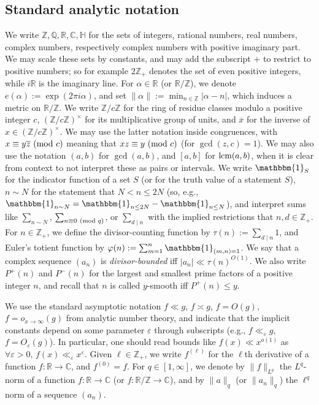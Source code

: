 \documentclass[reqno,11pt]{amsart}
\theoremstyle{remark}
\numberwithin{equation}{section}
\newcommand{\Z}{\mathbb{Z}}
\newcommand{\R}{\mathbb{R}}
\newcommand{\Q}{\mathbb{Q}}
\newcommand{\C}{\mathbb{C}}
\renewcommand{\H}{\mathbb{H}}
\newcommand{\one}{\mathbbm{1}}
\newcommand{\eps}{\varepsilon}
\renewcommand{\bar}{\overline}
\renewcommand{\pmod}[1]{\ (\textnormal{mod } #1)}
\newcommand{\lcm}{\textnormal{lcm}}
\begin{document}
\subsection{Standard analytic notation} \label{subsec:standard-notation}

We write $\Z, \Q, \R, \C, \H$ for the sets of integers, rational numbers, real numbers, complex numbers, respectively complex numbers with positive imaginary part. We may scale these sets by constants, and may add the subscript $+$ to restrict to positive numbers; so for example $2\Z_+$ denotes the set of even positive integers, while $i\R$ is the imaginary line. For $\alpha \in \R$ (or $\R/\Z$), we denote $e(\alpha) := \exp(2 \pi i \alpha)$, and set $\|\alpha\| := \min_{n \in \Z} |\alpha - n|$, which induces a metric on $\R/\Z$. We write $\Z/c\Z$ for the ring of residue classes modulo a positive integer $c$, $(\Z/c\Z)^\times$ for its multiplicative group of units, and $\bar{x}$ for the inverse of $x \in (\Z/c\Z)^\times$. We may use the latter notation inside congruences, with $x \equiv y\bar{z} \pmod{c}$ meaning that $xz \equiv y \pmod{c}$ (for $\gcd(z, c) = 1$). We may also use the notation $(a, b)$ for $\gcd(a, b)$, and $[a, b]$ for $\lcm(a, b)$, when it is clear from context to not interpret these as pairs or intervals. We write $\one_S$ for the indicator function of a set $S$ (or for the truth value of a statement $S$), $n \sim N$ for the statement that $N < n \le 2N$ (so, e.g., $\one_{n \sim N} = \one_{n \le 2N} - \one_{n \le N}$), and interpret sums like $\sum_{n \sim N}$, $\sum_{n \equiv 0 \pmod{q}}$, or $\sum_{d \mid n}$ with the implied restrictions that $n, d \in \Z_+$. For $n \in \Z_+$, we define the divisor-counting function by $\tau(n) := \sum_{d \mid n} 1$, and Euler's totient function by $\varphi(n) := \sum_{m = 1}^n \one_{(m, n) = 1}$. We say that a complex sequence $(a_n)$ is \emph{divisor-bounded} iff $|a_n| \ll \tau(n)^{O(1)}$. We also write $P^+(n)$ and $P^-(n)$ for the largest and smallest prime factors of a positive integer $n$, and recall that $n$ is called $y$-smooth iff $P^+(n) \le y$.

We use the standard asymptotic notation $f \ll g$, $f \asymp g$, $f = O(g)$, $f = o_{x \to \infty}(g)$ from analytic number theory, and indicate that the implicit constants depend on some parameter $\eps$ through subscripts (e.g., $f \ll_\eps g$, $f = O_\eps(g)$). In particular, one should read bounds like $f(x) \ll x^{o(1)}$ as $\forall \eps > 0,\, f(x) \ll_\eps x^\eps$. Given $\ell \in \Z_+$, we write $f^{(\ell)}$ for the $\ell$th derivative of a function $f : \R \to \C$, and $f^{(0)} = f$. 
For $q \in [1, \infty]$, we denote by $\|f\|_{L^q}$ the $L^q$-norm of a function $f : \R \to \C$ (or $f : \R/\Z \to \C$), and by $\|a\|_q$ (or $\|a_n\|_q$) the $\ell^q$ norm of a sequence $(a_n)$.
\end{document}
